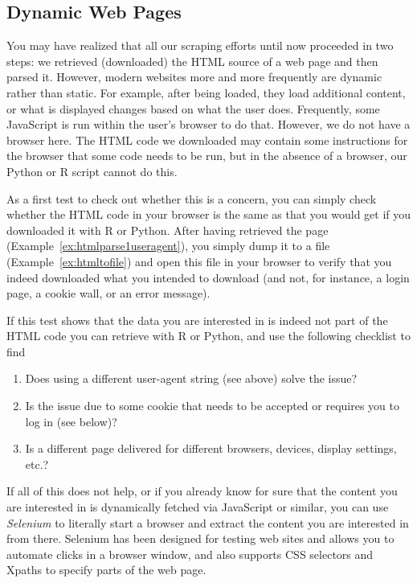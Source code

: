\subsection{Dynamic Web Pages}\label{sec:selenium}

You may have realized that all our scraping efforts until now
proceeded in two steps: we retrieved (downloaded) the HTML source of a
web page and then parsed it. However, modern websites more and more frequently 
are dynamic rather than static. For example, after being loaded, they
load additional content, or what is displayed changes based on what
the user does. Frequently, some JavaScript is run within the user's
browser to do that. However, we do not have a browser here. The HTML
code we downloaded may contain some instructions for the browser that
some code needs to be run, but in the absence of a browser, our Python
or R script cannot do this.

As a first test to check out whether this is a concern, you can simply
check whether the HTML code in your browser is the same as that you would
get if you downloaded it with R or Python.  After having retrieved the
page (Example~\ref{ex:htmlparse1useragent}), you simply dump it to a file
(Example~\ref{ex:htmltofile}) and open this file in your browser to verify that
you indeed downloaded what you intended to download (and not, for
instance, a login page, a cookie wall, or an error message).



If this test  shows that the data you are interested in is
indeed not part of the HTML code you can retrieve with R or Python,
and use the following checklist to find

\begin{enumerate}
\item Does using a different user-agent string (see above) solve the issue?
\item Is the issue due to some cookie that needs to be accepted or requires you to log in (see below)?
\item Is a different page delivered for different browsers, devices, display settings, etc.?
\end{enumerate}

If all of this does not help, or if you already know for sure that the
content you are interested in is dynamically fetched via JavaScript or
similar, you can use \emph{Selenium} to literally start a browser and
extract the content you are interested in from there. Selenium has
been designed for testing web sites and allows you to automate clicks 
in a browser window, and also supports CSS selectors and Xpaths
to specify parts of the web page.

